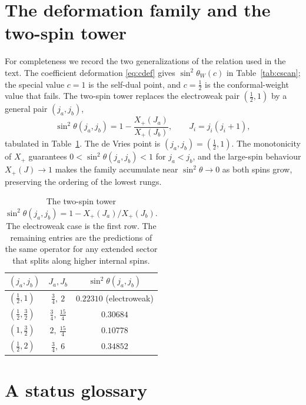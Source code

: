 \documentclass[11pt]{article}
\theoremstyle{plain}
\theoremstyle{definition}
\newcommand{\Xp}{X_{+}}
\newcommand{\half}{\tfrac12}
\begin{document}
\section{The deformation family and the two-spin tower}
\label{app:tower}

For completeness we record the two generalizations of the relation used in
the text. The coefficient deformation \eqref{eq:cdef} gives
$\sin^2\theta_W(c)$ in Table~\ref{tab:cscan}; the special value $c=1$ is the
self-dual point, and $c=\tfrac12$ is the conformal-weight value that fails.
The two-spin tower replaces the electroweak pair $(\half,1)$ by a general
pair $(j_a,j_b)$,
\begin{equation}
\sin^2\theta(j_a,j_b)=1-\frac{\Xp(J_a)}{\Xp(J_b)},
\qquad J_i=j_i(j_i+1),
\end{equation}
tabulated in Table~\ref{tab:tower}. The de Vries point is $(j_a,j_b)=(\half,1)$.
The monotonicity of $\Xp$ guarantees $0<\sin^2\theta(j_a,j_b)<1$ for
$j_a<j_b$, and the large-spin behaviour $\Xp(J)\to1$ makes the family
accumulate near $\sin^2\theta\to0$ as both spins grow, preserving the
ordering of the lowest rungs.

\begin{table}[h]
\centering
\begin{tabular}{lcc}
\toprule
$(j_a,j_b)$ & $J_a,J_b$ & $\sin^2\theta(j_a,j_b)$\\
\midrule
$(\tfrac12,1)$ & $\tfrac34,\ 2$ & $0.22310$ \quad(electroweak)\\
$(\tfrac12,\tfrac32)$ & $\tfrac34,\ \tfrac{15}4$ & $0.30684$\\
$(1,\tfrac32)$ & $2,\ \tfrac{15}4$ & $0.10778$\\
$(\tfrac12,2)$ & $\tfrac34,\ 6$ & $0.34852$\\
\bottomrule
\end{tabular}
\caption{The two-spin tower $\sin^2\theta(j_a,j_b)=1-\Xp(J_a)/\Xp(J_b)$. The
electroweak case is the first row. The remaining entries are the predictions
of the same operator for any extended sector that splits along higher
internal spins.}
\label{tab:tower}
\end{table}

\section{A status glossary}
\label{app:status}
\end{document}
